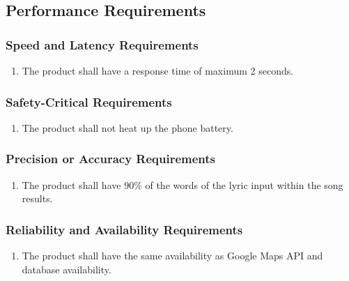 \documentclass[]{article}
\newcounter{saveenum}
\newcommand{\pauseEnum}{\setcounter{saveenum}{\value{enumi}}}
\newcommand{\resumeEnum}{\setcounter{enumi}{\value{saveenum}}}
\begin{document}

\subsection{Performance Requirements}
\label{sub:performance_requirements}

\subsubsection{Speed and Latency Requirements}
\label{ssub:speed_and_latency_requirements}
\begin{enumerate}[{PR}1. ]
	\item The product shall have a response time of maximum 2 seconds.
	\pauseEnum
\end{enumerate}

\subsubsection{Safety-Critical Requirements}
\label{ssub:safety_critical_requirements}
\begin{enumerate}[{PR}1. ]
	\resumeEnum
	\item The product shall not heat up the phone battery.
	\pauseEnum
\end{enumerate}

\subsubsection{Precision or Accuracy Requirements}
\label{ssub:precision_or_accuracy_requirements}
\begin{enumerate}[{PR}1. ]
	\resumeEnum
	\item The product shall have 90\% of the words of the lyric input within the song results.
	\pauseEnum
\end{enumerate}

\subsubsection{Reliability and Availability Requirements}
\label{ssub:reliability_and_availability_requirements}
\begin{enumerate}[{PR}1. ]
	\resumeEnum
	\item The product shall have the same availability as Google Maps API and database availability.
	\pauseEnum
\end{enumerate}
\end{document}
